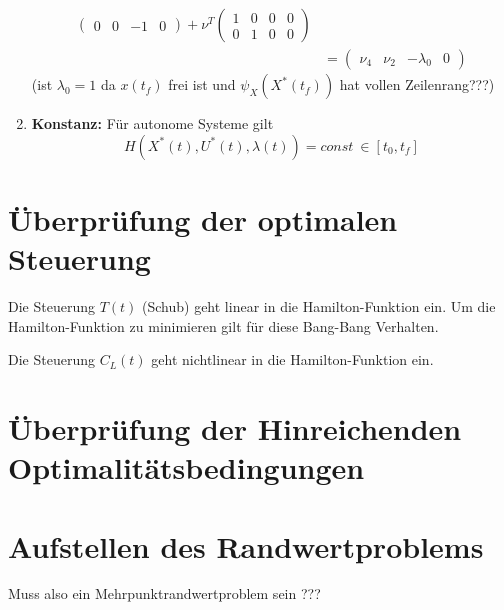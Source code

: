 \begin{enumerate}
\[\begin{split}
\begin{pmatrix}
0 & 0 & -1 & 0
\end{pmatrix}  + \nu^T \begin{pmatrix}
1 & 0 & 0 & 0 \\
0 & 1 & 0 & 0 
\end{pmatrix}  \\\
&= \begin{pmatrix}
\nu_4 & \nu_2 & -\lambda_0 & 0 
\end{pmatrix}
\end{split}\]
(ist $\lambda_{0} =1$ da $x(t_f)$ frei ist und $\psi_X(X^{\ast}(t_f))$ hat vollen Zeilenrang???) 
%
\item \textbf{Konstanz:} Für autonome Systeme gilt \[H(X^{\ast}(t),U^{\ast}(t), \lambda(t)) = const \ \in [t_0,t_f]\]
\end{enumerate}






\section{Überprüfung der optimalen Steuerung}
Die Steuerung $T(t)$ (Schub) geht linear in die Hamilton-Funktion ein. Um die Hamilton-Funktion zu minimieren gilt für diese Bang-Bang Verhalten.

Die Steuerung $C_L(t)$ geht nichtlinear in die Hamilton-Funktion ein.






\section{Überprüfung der Hinreichenden Optimalitätsbedingungen}







\section{Aufstellen des Randwertproblems}
Muss also ein Mehrpunktrandwertproblem sein ???


